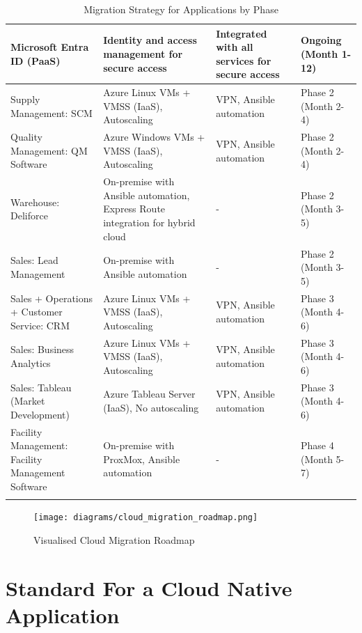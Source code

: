 \documentclass{llncs}
\begin{document}
\begin{longtable}{|p{3.1cm}|p{5.2cm}|p{3.1cm}|l|}
    \hline
    Microsoft Entra ID (PaaS) & Identity and access management for secure access & Integrated with all services for secure access & Ongoing (Month 1-12) \\
    \hline
    Supply Management: SCM & Azure Linux VMs + VMSS (IaaS), Autoscaling & VPN, Ansible automation & Phase 2 (Month 2-4) \\
    \hline
    Quality Management: QM Software & Azure Windows VMs + VMSS (IaaS), Autoscaling & VPN, Ansible automation & Phase 2 (Month 2-4) \\
    \hline
    Warehouse: Deliforce & On-premise with Ansible automation, Express Route integration for hybrid cloud & - & Phase 2 (Month 3-5) \\
    \hline
    Sales: Lead Management & On-premise with Ansible automation & - & Phase 2 (Month 3-5) \\
    \hline
    Sales + Operations + Customer Service: CRM & Azure Linux VMs + VMSS (IaaS), Autoscaling & VPN, Ansible automation & Phase 3 (Month 4-6) \\
    \hline
    Sales: Business Analytics & Azure Linux VMs + VMSS (IaaS), Autoscaling & VPN, Ansible automation & Phase 3 (Month 4-6) \\
    \hline
    Sales: Tableau (Market Development) & Azure Tableau Server (IaaS), No autoscaling & VPN, Ansible automation & Phase 3 (Month 4-6) \\
    \hline
    Facility Management: Facility Management Software & On-premise with ProxMox, Ansible automation & - & Phase 4 (Month 5-7) \\
    \hline
    \caption{Migration Strategy for Applications by Phase}
    \end{longtable}

    \newpage

\begin{figure}[htbp]
        \begin{center}
            \texttt{[image: diagrams/cloud\_migration\_roadmap.png]}
            \vspace{0.01\textwidth}
            \caption{Visualised Cloud Migration Roadmap}
            \label{cloud migration roadmap} %
        \end{center}
\end{figure}
    

\section{Standard For a Cloud Native Application}
\end{document}
